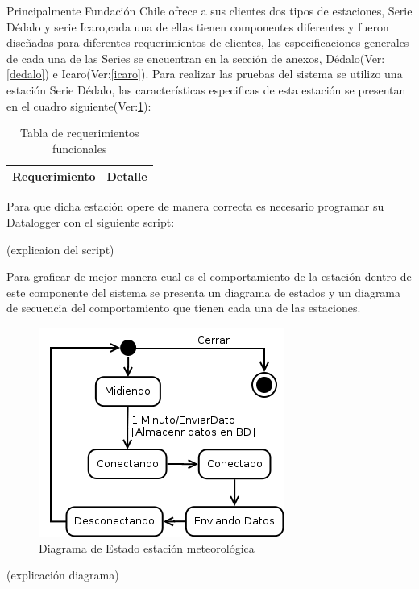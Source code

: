 {Principalmente Fundación Chile ofrece a sus clientes dos tipos de estaciones, Serie Dédalo y serie Icaro,cada una de ellas tienen componentes diferentes y fueron diseñadas para diferentes requerimientos de clientes, las especificaciones generales de cada una de las Series se encuentran en la sección de anexos, Dédalo(Ver:\ref{dedalo}) e Icaro(Ver:\ref{icaro}). Para realizar las pruebas del sistema se utilizo una estación Serie Dédalo, las características especificas de esta estación se presentan en el cuadro siguiente(Ver:\ref{estacionPrueba}):

\begin{table}[h!]
\label{estacionPrueba}
\caption{Tabla de requerimientos funcionales}
\begin{tabular}{| c | p{11cm} |}
        \hline
        \textbf{Requerimiento}  &       \textbf{Detalle}        \\
        \hline
\end{tabular}
\end{table}

Para que dicha estación opere de manera correcta es necesario programar su Datalogger con el siguiente script:

(explicaion del script)

Para graficar de mejor manera cual es el comportamiento de la estación dentro de este componente del sistema se presenta un diagrama de estados y un diagrama de secuencia del comportamiento que tienen cada una de las estaciones.

\begin{figure}[h!]
        \centering
        \includegraphics[scale=0.25]{images/estacionEstados}
        \caption{Diagrama de Estado estación meteorológica}
        \label{despliegue}
\end{figure}

(explicación diagrama)

}
